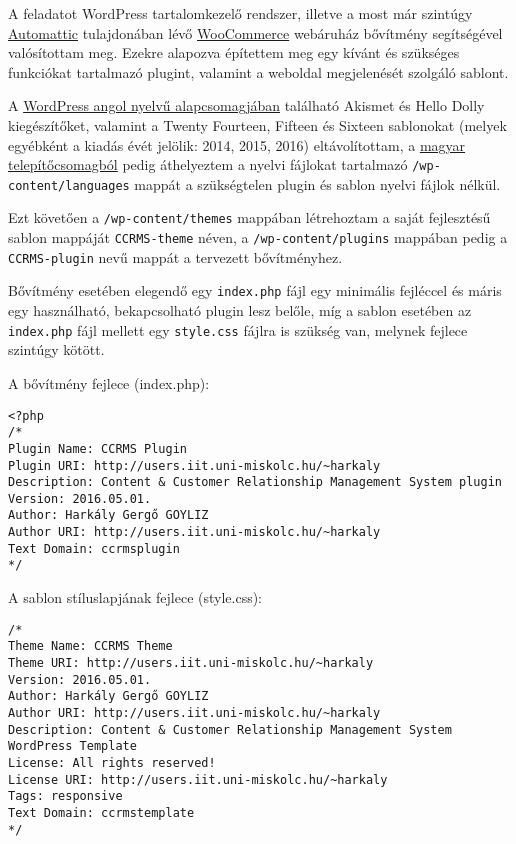 \label{Chap:dokumen}


A feladatot WordPress tartalomkezelő rendszer, illetve a most már szintúgy \href{https://automattic.com/}{Automattic} tulajdonában lévő \href{https://wordpress.org/plugins/woocommerce/}{WooCommerce} webáruház bővítmény segítségével valósítottam meg. Ezekre alapozva építettem meg egy kívánt és szükséges funkciókat tartalmazó plugint, valamint a weboldal megjelenését szolgáló sablont.

A  \href{https://wordpress.org/download/}{WordPress angol nyelvű alapcsomagjában} található Akismet és Hello Dolly kiegészítőket, valamint a Twenty Fourteen, Fifteen és Sixteen sablonokat (melyek egyébként a kiadás évét jelölik: 2014, 2015, 2016) eltávolítottam, a \href{https://hu.wordpress.org/}{magyar telepítőcsomagból} pedig áthelyeztem a nyelvi fájlokat tartalmazó \verb|/wp-content/languages| mappát a szükségtelen plugin és sablon nyelvi fájlok nélkül.

Ezt követően a \texttt{/wp-content/themes} mappában létrehoztam a saját fejlesztésű sablon mappáját \texttt{CCRMS-theme} néven, a \texttt{/wp-content/plugins} mappában pedig a \texttt{CCRMS-plugin} nevű mappát a tervezett bővítményhez.

Bővítmény esetében elegendő egy \verb|index.php| fájl egy minimális fejléccel és máris egy használható, bekapcsolható plugin lesz belőle, míg a sablon esetében az \verb|index.php| fájl mellett egy \verb|style.css| fájlra is szükség van, melynek fejlece szintúgy kötött.

A bővítmény fejlece (index.php):
\begin{lstlisting}
<?php
/*
Plugin Name: CCRMS Plugin
Plugin URI: http://users.iit.uni-miskolc.hu/~harkaly
Description: Content & Customer Relationship Management System plugin
Version: 2016.05.01.
Author: Harkály Gergő GOYLIZ
Author URI: http://users.iit.uni-miskolc.hu/~harkaly
Text Domain: ccrmsplugin
*/
\end{lstlisting}

A sablon stíluslapjának fejlece (style.css):

\begin{lstlisting}
/*
Theme Name: CCRMS Theme
Theme URI: http://users.iit.uni-miskolc.hu/~harkaly
Version: 2016.05.01.
Author: Harkály Gergő GOYLIZ
Author URI: http://users.iit.uni-miskolc.hu/~harkaly
Description: Content & Customer Relationship Management System WordPress Template
License: All rights reserved!
License URI: http://users.iit.uni-miskolc.hu/~harkaly
Tags: responsive
Text Domain: ccrmstemplate
*/
\end{lstlisting}

